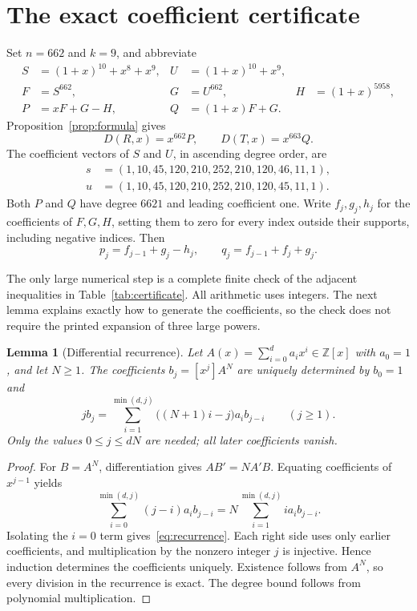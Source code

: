 \documentclass[11pt]{article}
\newtheorem{lemma}[theorem]{Lemma}
\newcommand{\D}{D}
\begin{document}
\section{The exact coefficient certificate}
Set $n=662$ and $k=9$, and abbreviate
\begin{align*}
 S&=(1+x)^{10}+x^8+x^9,& U&=(1+x)^{10}+x^9,\\
 F&=S^{662},&G&=U^{662},&H&=(1+x)^{5958},\\
 P&=xF+G-H,&Q&=(1+x)F+G.
\end{align*}
Proposition~\ref{prop:formula} gives
\begin{equation}\label{eq:shifts}
 \D(R,x)=x^{662}P,\qquad \D(T,x)=x^{663}Q.
\end{equation}
The coefficient vectors of $S$ and $U$, in ascending degree order, are
\begin{align*}
 s&=(1,10,45,120,210,252,210,120,46,11,1),\\
 u&=(1,10,45,120,210,252,210,120,45,11,1).
\end{align*}
Both $P$ and $Q$ have degree $6621$ and leading coefficient one. Write $f_j,g_j,h_j$ for the coefficients of $F,G,H$, setting them to zero for every index outside their supports, including negative indices. Then
\begin{equation}\label{eq:pqcoeff}
 p_j=f_{j-1}+g_j-h_j,\qquad
 q_j=f_{j-1}+f_j+g_j.
\end{equation}

The only large numerical step is a complete finite check of the adjacent inequalities in Table~\ref{tab:certificate}. All arithmetic uses integers. The next lemma explains exactly how to generate the coefficients, so the check does not require the printed expansion of three large powers.

\begin{lemma}[Differential recurrence]\label{lem:recurrence}
Let $A(x)=\sum_{i=0}^d a_i x^i\in\mathbb Z[x]$ with $a_0=1$, and let $N\ge1$. The coefficients $b_j=[x^j]A^N$ are uniquely determined by $b_0=1$ and
\begin{equation}\label{eq:recurrence}
 j b_j=\sum_{i=1}^{\min(d,j)}\bigl((N+1)i-j\bigr)a_i b_{j-i}
 \qquad(j\ge1).
\end{equation}
Only the values $0\le j\le dN$ are needed; all later coefficients vanish.
\end{lemma}
\begin{proof}
For $B=A^N$, differentiation gives $AB'=NA'B$. Equating coefficients of $x^{j-1}$ yields
\[
 \sum_{i=0}^{\min(d,j)}(j-i)a_i b_{j-i}
 =N\sum_{i=1}^{\min(d,j)}i a_i b_{j-i}.
\]
Isolating the $i=0$ term gives~\eqref{eq:recurrence}. Each right side uses only earlier coefficients, and multiplication by the nonzero integer $j$ is injective. Hence induction determines the coefficients uniquely. Existence follows from $A^N$, so every division in the recurrence is exact. The degree bound follows from polynomial multiplication.
\end{proof}
\end{document}
